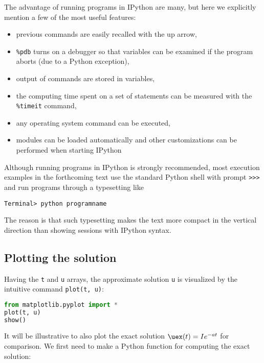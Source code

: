 \documentclass[graybox,sectrefs,envcountresetchap,open=right,final]{svmonodo}
\begin{document}
The advantage of running programs in IPython are many, but here
we explicitly mention a few of the most
useful features:

\begin{itemize}
 \item previous commands are easily recalled with the up arrow,

 \item \Verb!%
   aborts (due to a Python exception),

 \item output of commands are stored in variables,

 \item the computing time spent on a set of statements can be measured with
   the \Verb!%

 \item any operating system command can be executed,

 \item modules can be loaded automatically and other customizations can
   be performed when starting IPython
\end{itemize}

\noindent
Although running programs in IPython is strongly recommended, most
execution examples in the forthcoming text use the standard
Python shell with prompt \Verb!>>>! and run programs through
a typesetting like

\begin{Verbatim}[frame=lines,label=\fbox{{\tiny Terminal}},framesep=2.5mm,framerule=0.7pt,fontsize=\fontsize{9pt}{9pt}]
Terminal> python programname
\end{Verbatim}
The reason is that such typesetting
makes the text more compact in the vertical direction
than showing sessions with IPython syntax.

\label{decay:plotting}

\subsection{Plotting the solution}

Having the \texttt{t} and \texttt{u} arrays, the approximate solution \texttt{u} is visualized
by the intuitive command \texttt{plot(t, u)}:

\begin{lstlisting}[language=Python,style=blue1_bluegreen]
from matplotlib.pyplot import *
plot(t, u)
show()
\end{lstlisting}
It will be illustrative to also plot the exact solution
$\uex(t)=Ie^{-at}$ for comparison. We first
need to make a Python function for computing the exact solution:
\end{document}
